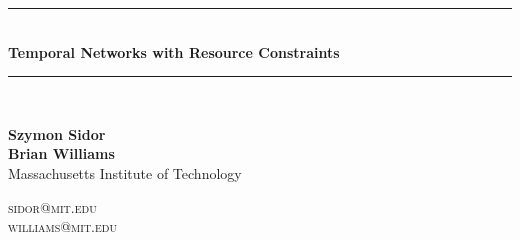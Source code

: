 \documentclass{article}
\newcommand{\HRule}{\rule{\linewidth}{0.5mm}}
\begin{document}
\thispagestyle{empty}

\begin{center}
\HRule \\[0.3cm]
{\Large \bfseries
Temporal Networks with Resource Constraints\\[0.3cm]}
\HRule \\[0.5cm]

\noindent
\begin{minipage}{0.5\textwidth}
\begin{flushleft}
\textbf{Szymon Sidor\\
Brian Williams}\\
Massachusetts Institute of Technology
\end{flushleft}
\end{minipage}%
\begin{minipage}{0.5\textwidth}
\begin{flushright}
\textsc{sidor@mit.edu}\\
\textsc{williams@mit.edu}\\
$\ $
\end{flushright}
\end{minipage}
\\[1cm]
\end{center}
\pagestyle{fancy}
\end{document}
